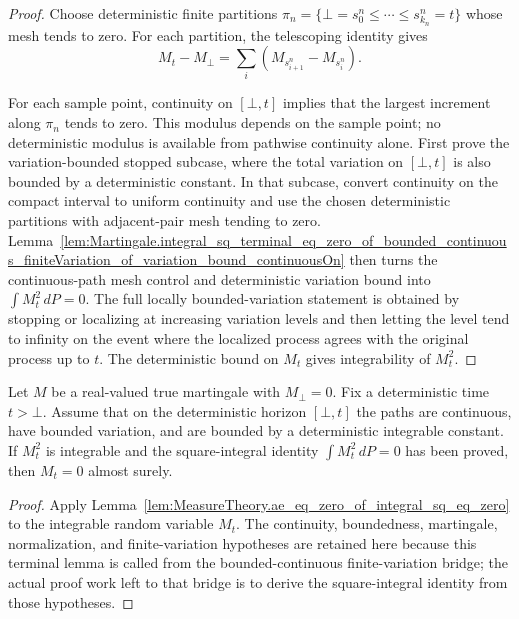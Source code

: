 \begin{proof}
Choose deterministic finite partitions
\(\pi_n=\{\bot=s^n_0\le \cdots \le s^n_{k_n}=t\}\) whose mesh tends to zero.
For each partition, the telescoping identity gives
\[
  M_t-M_\bot
  =
  \sum_i (M_{s^n_{i+1}}-M_{s^n_i}).
\]

For each sample point, continuity on \([\bot,t]\) implies that the largest
increment along \(\pi_n\) tends to zero.  This modulus depends on the sample
point; no deterministic modulus is available from pathwise continuity alone.
First prove the variation-bounded stopped subcase, where the total variation on
\([\bot,t]\) is also bounded by a deterministic constant.  In that subcase,
convert continuity on the compact interval to uniform continuity and use the
chosen deterministic partitions with adjacent-pair mesh tending to zero.
Lemma~\ref{lem:Martingale.integral_sq_terminal_eq_zero_of_bounded_continuous_finiteVariation_of_variation_bound_continuousOn}
then turns the continuous-path mesh control and deterministic variation bound
into \(\int M_t^2\,dP=0\).  The full locally bounded-variation statement is
obtained by stopping or localizing at increasing variation levels and then
letting the level tend to infinity on the event where the localized process
agrees with the original process up to \(t\).  The deterministic bound on
\(M_t\) gives integrability of \(M_t^2\).
\end{proof}

\begin{lemma}\label{lem:Martingale.eq_zero_of_bounded_continuous_finiteVariation_core}
Let \(M\) be a real-valued true martingale with \(M_\bot=0\).  Fix a
deterministic time \(t>\bot\).  Assume that on the deterministic horizon
\([\bot,t]\) the paths are continuous, have bounded variation, and are bounded
by a deterministic integrable constant.  If \(M_t^2\) is integrable and the
square-integral identity \(\int M_t^2\,dP=0\) has been proved, then \(M_t=0\)
almost surely.
\end{lemma}

\begin{proof}
Apply
Lemma~\ref{lem:MeasureTheory.ae_eq_zero_of_integral_sq_eq_zero} to the
integrable random variable \(M_t\).  The continuity, boundedness, martingale,
normalization, and finite-variation hypotheses are retained here because this
terminal lemma is called from the bounded-continuous finite-variation bridge;
the actual proof work left to that bridge is to derive the square-integral
identity from those hypotheses.
\end{proof}


